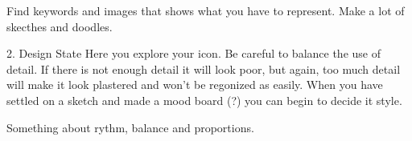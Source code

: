 Find keywords and images that shows what you have to represent. 
Make a lot of skecthes and doodles.

2. Design State
Here you explore your icon. Be careful to balance the use of detail. If there is not enough detail it will look poor, but again, too much detail will make it look plastered and won't be regonized as easily. When you have settled on a sketch and made a mood board (?) you can begin to decide it style. 


Something about rythm, balance and proportions. \cite{DesignPrinciple}


